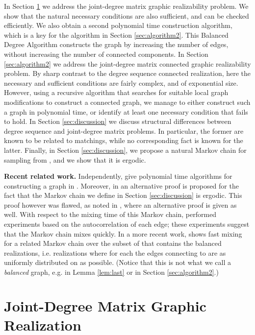 \documentclass[12pt,a4paper]{article}
\theoremstyle{definition}
\theoremstyle{plain}
\begin{document}
In Section \ref{sec:algorithm1} we address the joint-degree matrix
graphic realizability problem. We show that the natural necessary conditions
are also sufficient, and can be checked efficiently. 
We also obtain a second polynomial time construction 
algorithm, which is a key for the algorithm in Section \ref{sec:algorithm2}.
This Balanced Degree Algorithm constructs the graph by increasing the number of
edges, without increasing the number of connected components.
In Section \ref{sec:algorithm2} we address 
the joint-degree matrix connected graphic realizability problem.
By sharp contrast to the degree sequence connected realization, 
here the necessary and sufficient conditions are fairly complex,
and of exponential size. However, using a recursive algorithm
that searches for suitable local graph modifications to construct
a connected graph, we manage to either construct such a graph in polynomial time, or identify 
at least one necessary condition that fails to hold. 
In Section \ref{sec:discussion} we discuss 
structural differences between degree sequence 
and joint-degree matrix problems. 
In particular, the former are known to be related to 
matchings, while no corresponding fact is known for the latter. 
Finally, in Section \ref{sec:discussion}, we propose a natural Markov chain 
for sampling from , and we show  that it is 
ergodic.

\noindent \textbf{Recent related work.} Independently, \cite{SP12, CDEM15, GTM15} give polynomial time algorithms for constructing a graph in . Moreover, in \cite{SP12} an alternative proof is proposed for the fact that the Markov chain we define in Section \ref{sec:discussion} is ergodic. This proof however was flawed, as noted in \cite{CDEM15}, where an alternative proof is given as well. With respect to the mixing time of this Markov chain, \cite{SP12} performed experiments based on the autocorrelation of each edge; these experiments
suggest that the Markov chain mixes quickly. In a more recent work, \cite{EMT15} shows fast mixing for a related Markov chain over the subset of  that contains the balanced realizations, i.e. realizations where for each  the edges connecting  to  are as uniformly distributed on  as possible. (Notice that this is not what we call a \emph{balanced} graph, e.g. in Lemma \ref{lem:last} or in Section \ref{sec:algorithm2}.)



\section{Joint-Degree Matrix Graphic Realization}
\label{sec:algorithm1}
\end{document}
